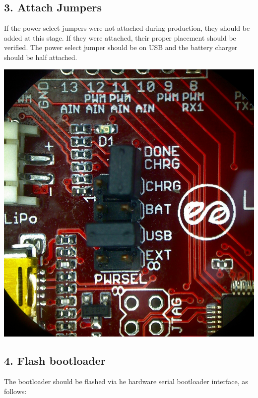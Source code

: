 \documentclass[a4paper,12pt]{report}
\begin{document}
\subsection*{3. Attach Jumpers}

If the power select jumpers were not attached during production, they should be added at this stage. If they were attached, their proper placement should be verified. The power select jumper should be on USB and the battery charger should be half attached.

\begin{center}
\includegraphics[width=\linewidth]{jumpers}
\end{center}

\subsection*{4. Flash bootloader}
The bootloader should be flashed via he hardware serial bootloader interface, as follows:
\end{document}
